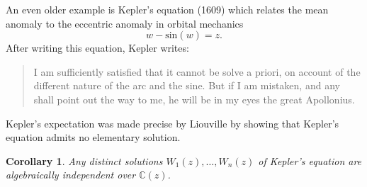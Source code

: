 \documentclass[12pt]{amsart}
\theoremstyle{definition}
\theoremstyle{plain}
\newtheorem{cor}[defn]{Corollary}
\theoremstyle{exampstyle}\newtheorem{thmx}{Theorem}
\theoremstyle{exampstyle}\newtheorem{thmxbis}{Theorem}
\begin{document}
An even older example is Kepler's equation (1609) which relates the mean anomaly to the eccentric anomaly in orbital mechanics
$$ w - \mathrm{sin}(w) = z.$$
After writing this equation, Kepler writes:
\begin{quote} 
I am sufficiently satisfied that it cannot be solve a priori, on account of the different nature of the arc and the sine. But if I am mistaken, and any shall point out the way to me, he will be in my eyes the great Apollonius.
\end{quote} 
Kepler's expectation was made precise by Liouville\cite{Liouville} by showing that Kepler's equation admits no elementary solution. 
\begin{cor} \label{cor-Kepler}
Any distinct solutions $W_1(z),\ldots, W_n(z)$ of Kepler's equation are algebraically independent over $\mathbb{C}(z)$. 
\end{cor} 
\end{document}
